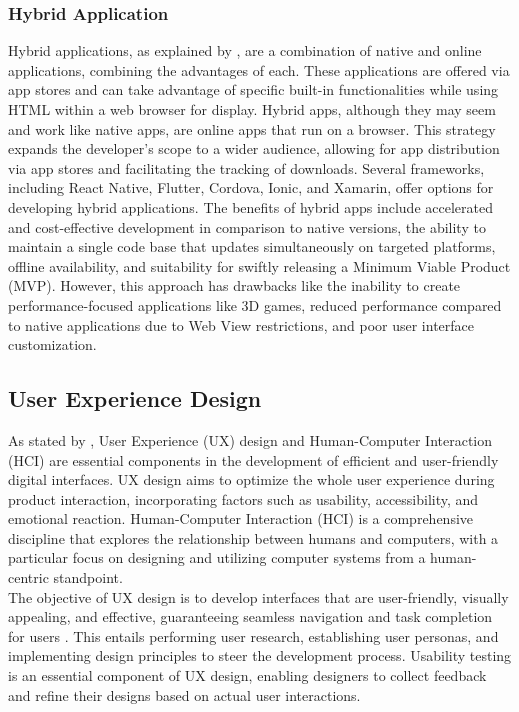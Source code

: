 \subsubsection{Hybrid Application}
Hybrid applications, as explained by \textcite{syeed21}, are a combination of native and online applications, combining the advantages of each. These applications are offered via app stores and can take advantage of specific built-in functionalities while using HTML within a web browser for display. Hybrid apps, although they may seem and work like native apps, are online apps that run on a browser. This strategy expands the developer's scope to a wider audience, allowing for app distribution via app stores and facilitating the tracking of downloads. Several frameworks, including React Native, Flutter, Cordova, Ionic, and Xamarin, offer options for developing hybrid applications. The benefits of hybrid apps include accelerated and cost-effective development in comparison to native versions, the ability to maintain a single code base that updates simultaneously on targeted platforms, offline availability, and suitability for swiftly releasing a Minimum Viable Product (MVP). However, this approach has drawbacks like the inability to create performance-focused applications like 3D games, reduced performance compared to native applications due to Web View restrictions, and poor user interface customization.

\subsection{User Experience Design}
As stated by \textcite{olawole18}, User Experience (UX) design and Human-Computer Interaction (HCI) are essential components in the development of efficient and user-friendly digital interfaces. UX design aims to optimize the whole user experience during product interaction, incorporating factors such as usability, accessibility, and emotional reaction. Human-Computer Interaction (HCI) is a comprehensive discipline that explores the relationship between humans and computers, with a particular focus on designing and utilizing computer systems from a human-centric standpoint. \\

The objective of UX design is to develop interfaces that are user-friendly, visually appealing, and effective, guaranteeing seamless navigation and task completion for users \parencite{olawole18}. This entails performing user research, establishing user personas, and implementing design principles to steer the development process. Usability testing is an essential component of UX design, enabling designers to collect feedback and refine their designs based on actual user interactions. \\

